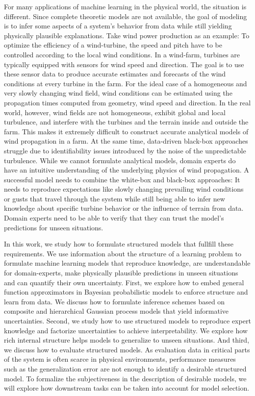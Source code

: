 For many applications of machine learning in the physical world, the situation is different.
Since complete theoretic models are not available, the goal of modeling is to infer some aspects of a system's behavior from data while still yielding physically plausible explanations.
Take wind power production as an example:
To optimize the efficiency of a wind-turbine, the speed and pitch have to be controlled according to the local wind conditions.
In a wind-farm, turbines are typically equipped with sensors for wind speed and direction.
The goal is to use these sensor data to produce accurate estimates and forecasts of the wind conditions at every turbine in the farm.
For the ideal case of a homogeneous and very slowly changing wind field, wind conditions can be estimated using the propagation times computed from geometry, wind speed and direction.
In the real world, however, wind fields are not homogeneous, exhibit global and local turbulence, and interfere with the turbines and the terrain inside and outside the farm.
This makes it extremely difficult to construct accurate analytical models of wind propagation in a farm.
At the same time, data-driven black-box approaches struggle due to identifiability issues introduced by the noise of the unpredictable turbulence.
While we cannot formulate analytical models, domain experts do have an intuitive understanding of the underlying physics of wind propagation.
A successful model needs to combine the white-box and black-box approaches:
It needs to reproduce expectations like slowly changing prevailing wind conditions or gusts that travel through the system while still being able to infer new knowledge about specific turbine behavior or the influence of terrain from data.
Domain experts need to be able to verify that they can trust the model's predictions for unseen situations.

In this work, we study how to formulate structured models that fullfill these requirements.
We use information about the structure of a learning problem to formulate machine learning models that reproduce knowledge, are understandable for domain-experts, make physically plausible predictions in unseen situations and can quantify their own uncertainty.
First, we explore how to embed general function approximators in Bayesian probabilistic models to enforce structure and learn from data.
We discuss how to formulate inference schemes based on composite and hierarchical Gaussian process models that yield informative uncertainties.
Second, we study how to use structured models to reproduce expert knowledge and factorize uncertainties to achieve interpretability.
We explore how rich internal structure helps models to generalize to unseen situations.
And third, we discuss how to evaluate structured models.
As evaluation data in critical parts of the system is often scarce in physical environments, performance measures such as the generalization error are not enough to identify a desirable structured model.
To formalize the subjectiveness in the description of desirable models, we will explore how downstream tasks can be taken into account for model selection.


